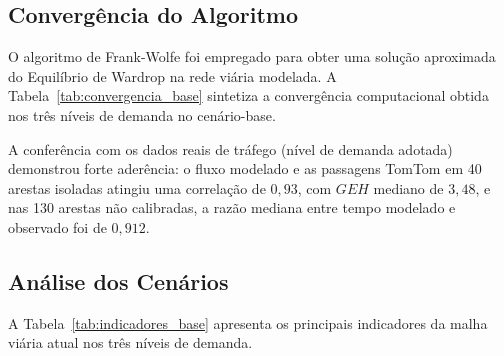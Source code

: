 \documentclass[portuguese]{sbc2025}%
\begin{document}
\subsection{Convergência do Algoritmo}
O algoritmo de Frank-Wolfe foi empregado para obter uma solução aproximada do Equilíbrio de Wardrop na rede viária modelada. A Tabela~\ref{tab:convergencia_base} sintetiza a convergência computacional obtida nos três níveis de demanda no cenário-base.

\begin{table}[htbp]
\caption{Desempenho de Convergência do Algoritmo de Frank-Wolfe}
\label{tab:convergencia_base}
\centering
{}
\end{table}

A conferência com os dados reais de tráfego (nível de demanda adotada) demonstrou forte aderência: o fluxo modelado e as passagens TomTom em 40 arestas isoladas atingiu uma correlação de $0,93$, com $GEH$ mediano de $3,48$, e nas 130 arestas não calibradas, a razão mediana entre tempo modelado e observado foi de $0,912$.

\subsection{Análise dos Cenários}
A Tabela~\ref{tab:indicadores_base} apresenta os principais indicadores da malha viária atual nos três níveis de demanda.

\begin{table}[htbp]
\caption{Indicadores Macro do Sistema}
\label{tab:indicadores_base}
\centering
{}
\end{table}
\end{document}
